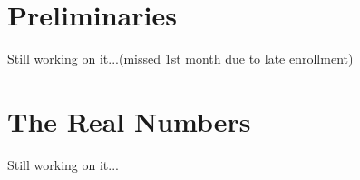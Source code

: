 \documentclass[a4paper,12pt]{article}
\begin{document}
\maketitle
{}
\newpage

\section{Preliminaries}
Still working on it...(missed 1st month due to late enrollment)







\section{The Real Numbers}
Still working on it...








\end{document}
